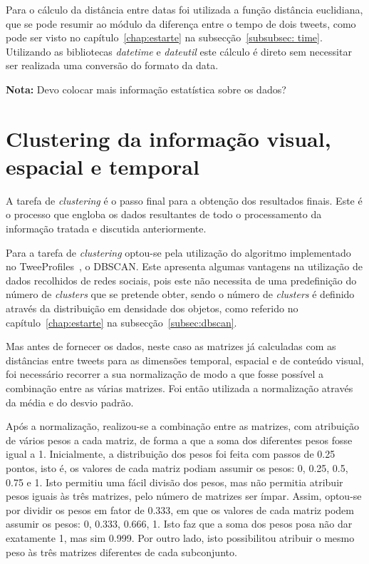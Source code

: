 Para o cálculo da distância entre datas foi utilizada a função distância euclidiana, que se pode resumir ao módulo da diferença entre o tempo de dois tweets, como pode ser visto no capítulo~\ref{chap:estarte} na subsecção~\ref{subsubsec: time}. Utilizando as bibliotecas \textit{datetime} e \textit{dateutil} este cálculo é direto sem necessitar ser realizada uma conversão do formato da data.

\textbf{Nota:} Devo colocar mais informação estatística sobre os dados?

\section{Clustering da informação visual, espacial e temporal} \label{sec:finalclustering}

A tarefa de \textit{clustering} é o passo final para a obtenção dos resultados finais. Este é o processo que engloba os dados resultantes de todo o processamento da informação tratada e discutida anteriormente.

Para a tarefa de \textit{clustering} optou-se pela utilização do algoritmo implementado no TweeProfiles~\cite{Cunha2013}, o DBSCAN. Este apresenta algumas vantagens na utilização de dados recolhidos de redes sociais, pois este não necessita de uma predefinição do número de \textit{clusters} que se pretende obter, sendo o número de \textit{clusters} é definido através da distribuição em densidade dos objetos, como referido no capítulo~\ref{chap:estarte} na subsecção~\ref{subsec:dbscan}.

Mas antes de fornecer os dados, neste caso as matrizes já calculadas com as distâncias entre tweets para as dimensões temporal, espacial e de conteúdo visual, foi necessário recorrer a sua normalização de modo a que fosse possível a combinação entre as várias matrizes. Foi então utilizada a normalização através da média e do desvio padrão.

Após a normalização, realizou-se a combinação entre as matrizes, com atribuição de vários pesos a cada matriz, de forma a que a soma dos diferentes pesos fosse igual a 1. Inicialmente, a distribuição dos pesos foi feita com passos de 0.25 pontos, isto é, os valores de cada matriz podiam assumir os pesos: 0, 0.25, 0.5, 0.75 e 1. Isto permitiu uma fácil divisão dos pesos, mas não permitia atribuir pesos iguais às três matrizes, pelo número de matrizes ser ímpar. Assim, optou-se por dividir os pesos em fator de 0.333, em que os valores de cada matriz podem assumir os pesos: 0, 0.333, 0.666, 1. Isto faz que a soma dos pesos posa não dar exatamente 1, mas sim 0.999. Por outro lado, isto possibilitou atribuir o mesmo peso às três matrizes diferentes de cada subconjunto.

